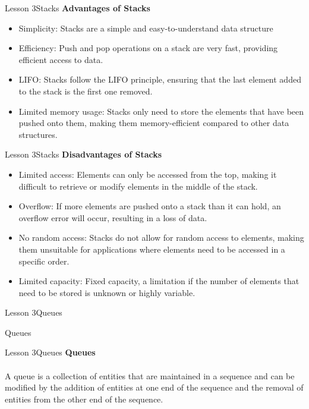 \documentclass[aspectratio=1610]{beamer}
\begin{document}
\begin{frame}{Lesson 3}{Stacks}
\Large
\textbf{Advantages of Stacks}\\
\begin{itemize}
\item Simplicity: Stacks are a simple and easy-to-understand data structure
\item Efficiency: Push and pop operations on a stack are very fast, providing efficient access to data.
\item LIFO: Stacks follow the LIFO principle, ensuring that the last element added to the stack is the first one removed.
\item Limited memory usage: Stacks only need to store the elements that have been pushed onto them, making them memory-efficient compared to other data structures.
\end{itemize}
\end{frame}



\begin{frame}{Lesson 3}{Stacks}
\Large
\textbf{Disadvantages of Stacks}\\
\begin{itemize}
\item Limited access: Elements can only be accessed from the top, making it difficult to retrieve or modify elements in the middle of the stack.
\item Overflow: If more elements are pushed onto a stack than it can hold, an overflow error will occur, resulting in a loss of data.
\item No random access: Stacks do not allow for random access to elements, making them unsuitable for applications where elements need to be accessed in a specific order.
\item Limited capacity: Fixed capacity, a limitation if the number of elements that need to be stored is unknown or highly variable.
\end{itemize}
\end{frame}



\begin{frame}{Lesson 3}{Queues}
\begin{center}
\Huge Queues
\end{center}
\end{frame}


\begin{frame}{Lesson 3}{Queues}
\LARGE
\textbf{Queues}\\~\\
A queue is a collection of entities that are maintained in
a sequence and can be modified by the addition of entities at one
end of the sequence and the removal of entities from the other end
of the sequence. 
\end{frame}
\end{document}
